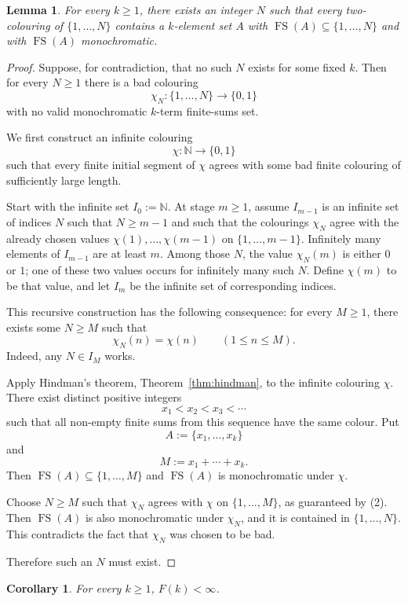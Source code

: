 \documentclass[11pt]{article}
\newtheorem{lemma}[theorem]{Lemma}
\newtheorem{corollary}[theorem]{Corollary}
\newcommand{\NN}{\mathbb N}
\newcommand{\FS}{\operatorname{FS}}
\begin{document}
\begin{lemma}\label{lem:finiteextraction}
For every $k\geq 1$, there exists an integer $N$ such that every two-colouring of $\{1,\ldots,N\}$ contains a $k$-element set $A$ with $\FS(A)\subseteq\{1,\ldots,N\}$ and with $\FS(A)$ monochromatic.
\end{lemma}

\begin{proof}
Suppose, for contradiction, that no such $N$ exists for some fixed $k$. Then for every $N\geq1$ there is a bad colouring
\[
    \chi_N:\{1,\ldots,N\}\to\{0,1\}
\]
with no valid monochromatic $k$-term finite-sums set.

We first construct an infinite colouring
\[
    \chi:\NN\to\{0,1\}
\]
such that every finite initial segment of $\chi$ agrees with some bad finite colouring of sufficiently large length.

Start with the infinite set $I_0:=\NN$. At stage $m\geq1$, assume $I_{m-1}$ is an infinite set of indices $N$ such that $N\geq m-1$ and such that the colourings $\chi_N$ agree with the already chosen values $\chi(1),\ldots,\chi(m-1)$ on $\{1,\ldots,m-1\}$. Infinitely many elements of $I_{m-1}$ are at least $m$. Among those $N$, the value $\chi_N(m)$ is either $0$ or $1$; one of these two values occurs for infinitely many such $N$. Define $\chi(m)$ to be that value, and let $I_m$ be the infinite set of corresponding indices.

This recursive construction has the following consequence: for every $M\geq1$, there exists some $N\geq M$ such that
\[
    \chi_N(n)=\chi(n)\qquad(1\leq n\leq M).       \tag{2}
\]
Indeed, any $N\in I_M$ works.

Apply Hindman's theorem, Theorem~\ref{thm:hindman}, to the infinite colouring $\chi$. There exist distinct positive integers
\[
    x_1<x_2<x_3<\cdots
\]
such that all non-empty finite sums from this sequence have the same colour. Put
\[
    A:=\{x_1,
\ldots,x_k\}
\]
and
\[
    M:=x_1+\cdots+x_k.
\]
Then $\FS(A)\subseteq\{1,\ldots,M\}$ and $\FS(A)$ is monochromatic under $\chi$.

Choose $N\geq M$ such that $\chi_N$ agrees with $\chi$ on $\{1,\ldots,M\}$, as guaranteed by (2). Then $\FS(A)$ is also monochromatic under $\chi_N$, and it is contained in $\{1,\ldots,N\}$. This contradicts the fact that $\chi_N$ was chosen to be bad.

Therefore such an $N$ must exist.
\end{proof}

\begin{corollary}\label{cor:finite}
For every $k\geq1$, $F(k)<\infty$.
\end{corollary}
\end{document}
